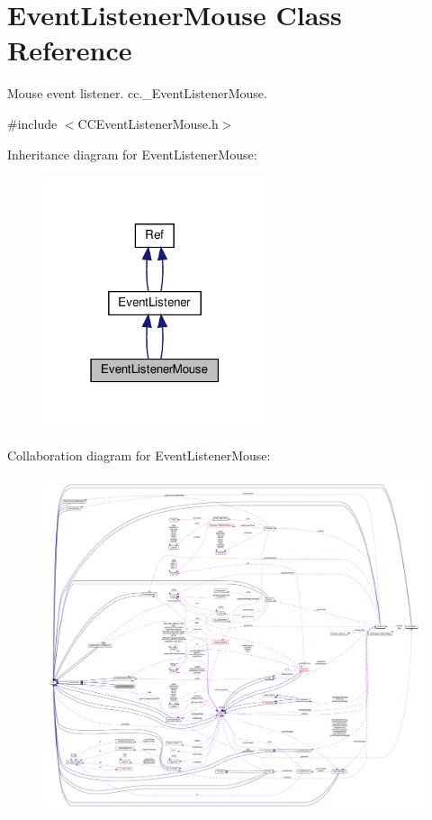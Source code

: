 \hypertarget{classEventListenerMouse}{}\section{Event\+Listener\+Mouse Class Reference}
\label{classEventListenerMouse}


Mouse event listener.  cc.\+\_\+\+Event\+Listener\+Mouse.  




{\ttfamily \#include $<$C\+C\+Event\+Listener\+Mouse.\+h$>$}



Inheritance diagram for Event\+Listener\+Mouse\+:
\nopagebreak
\begin{figure}[H]
\begin{center}
\leavevmode
\includegraphics[width=186pt]{classEventListenerMouse__inherit__graph}
\end{center}
\end{figure}


Collaboration diagram for Event\+Listener\+Mouse\+:
\nopagebreak
\begin{figure}[H]
\begin{center}
\leavevmode
\includegraphics[width=350pt]{classEventListenerMouse__coll__graph}
\end{center}
\end{figure}
